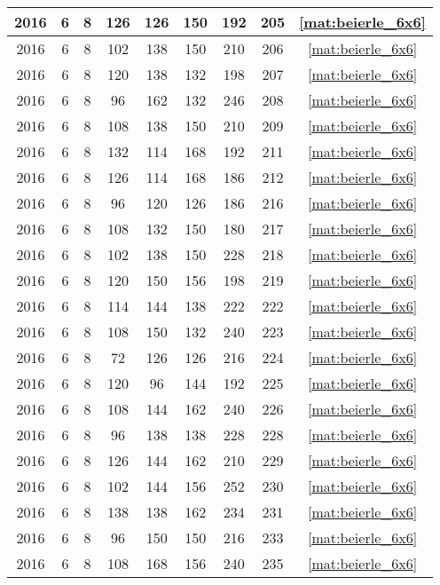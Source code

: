 \begin{longtable}{|c|c|c|c|c|c|c|c|c|}
2016 & 6 & 8 & 126 & 126 & 150 & 192 & 205 & \eqref{mat:beierle_6x6} \\ \hline 
2016 & 6 & 8 & 102 & 138 & 150 & 210 & 206 & \eqref{mat:beierle_6x6} \\ \hline 
2016 & 6 & 8 & 120 & 138 & 132 & 198 & 207 & \eqref{mat:beierle_6x6} \\ \hline 
2016 & 6 & 8 & 96 & 162 & 132 & 246 & 208 & \eqref{mat:beierle_6x6} \\ \hline 
2016 & 6 & 8 & 108 & 138 & 150 & 210 & 209 & \eqref{mat:beierle_6x6} \\ \hline 
2016 & 6 & 8 & 132 & 114 & 168 & 192 & 211 & \eqref{mat:beierle_6x6} \\ \hline 
2016 & 6 & 8 & 126 & 114 & 168 & 186 & 212 & \eqref{mat:beierle_6x6} \\ \hline 
2016 & 6 & 8 & 96 & 120 & 126 & 186 & 216 & \eqref{mat:beierle_6x6} \\ \hline 
2016 & 6 & 8 & 108 & 132 & 150 & 180 & 217 & \eqref{mat:beierle_6x6} \\ \hline 
2016 & 6 & 8 & 102 & 138 & 150 & 228 & 218 & \eqref{mat:beierle_6x6} \\ \hline 
2016 & 6 & 8 & 120 & 150 & 156 & 198 & 219 & \eqref{mat:beierle_6x6} \\ \hline 
2016 & 6 & 8 & 114 & 144 & 138 & 222 & 222 & \eqref{mat:beierle_6x6} \\ \hline 
2016 & 6 & 8 & 108 & 150 & 132 & 240 & 223 & \eqref{mat:beierle_6x6} \\ \hline 
2016 & 6 & 8 & 72 & 126 & 126 & 216 & 224 & \eqref{mat:beierle_6x6} \\ \hline 
2016 & 6 & 8 & 120 & 96 & 144 & 192 & 225 & \eqref{mat:beierle_6x6} \\ \hline 
2016 & 6 & 8 & 108 & 144 & 162 & 240 & 226 & \eqref{mat:beierle_6x6} \\ \hline 
2016 & 6 & 8 & 96 & 138 & 138 & 228 & 228 & \eqref{mat:beierle_6x6} \\ \hline 
2016 & 6 & 8 & 126 & 144 & 162 & 210 & 229 & \eqref{mat:beierle_6x6} \\ \hline 
2016 & 6 & 8 & 102 & 144 & 156 & 252 & 230 & \eqref{mat:beierle_6x6} \\ \hline 
2016 & 6 & 8 & 138 & 138 & 162 & 234 & 231 & \eqref{mat:beierle_6x6} \\ \hline 
2016 & 6 & 8 & 96 & 150 & 150 & 216 & 233 & \eqref{mat:beierle_6x6} \\ \hline 
2016 & 6 & 8 & 108 & 168 & 156 & 240 & 235 & \eqref{mat:beierle_6x6} \\ \hline 

\end{longtable}
